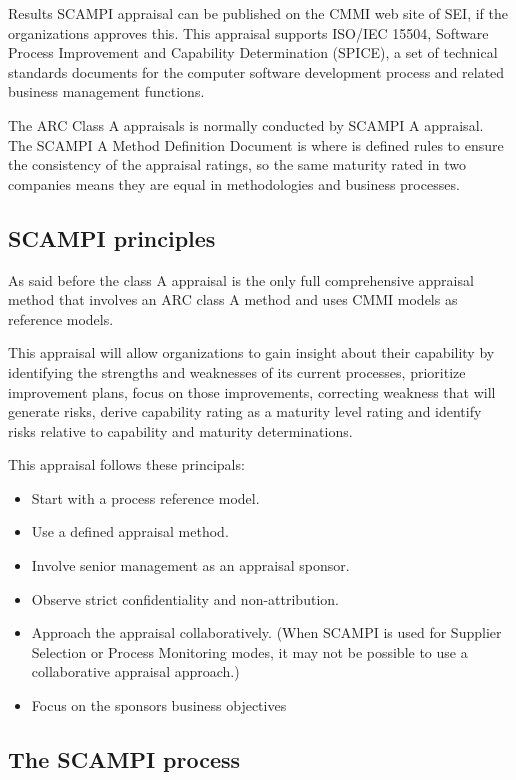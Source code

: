 Results SCAMPI appraisal can be published on the CMMI web site of SEI, if the organizations approves this. This appraisal supports ISO/IEC 15504, Software Process Improvement and Capability Determination (SPICE), a set of technical standards documents for the computer software development process and related business management functions.

The ARC Class A appraisals is normally conducted by SCAMPI A appraisal. The SCAMPI A Method Definition Document is where is defined rules to ensure the consistency of the appraisal ratings, so the same maturity rated in two companies means they are equal in methodologies and business processes.


\subsection{SCAMPI principles}
As said before the class A appraisal is the only full comprehensive appraisal method that involves an ARC class A method and uses CMMI models as reference models.

This appraisal will allow organizations to gain insight about their capability by identifying the strengths and weaknesses of its current processes, prioritize improvement plans, focus on those improvements, correcting weakness that will generate risks, derive capability rating as a maturity level rating and identify risks relative to capability and maturity determinations.

This appraisal follows these principals:
\begin{itemize}
	\item Start with a process reference model.
	\item Use a defined appraisal method.
	\item Involve senior management as an appraisal sponsor.
	\item Observe strict confidentiality and non-attribution.
	\item Approach the appraisal collaboratively. (When SCAMPI is used for Supplier Selection or Process Monitoring modes, it may not be
	possible to use a collaborative appraisal approach.)
	\item Focus on the sponsors business objectives
\end{itemize}

\subsection{The SCAMPI process}

